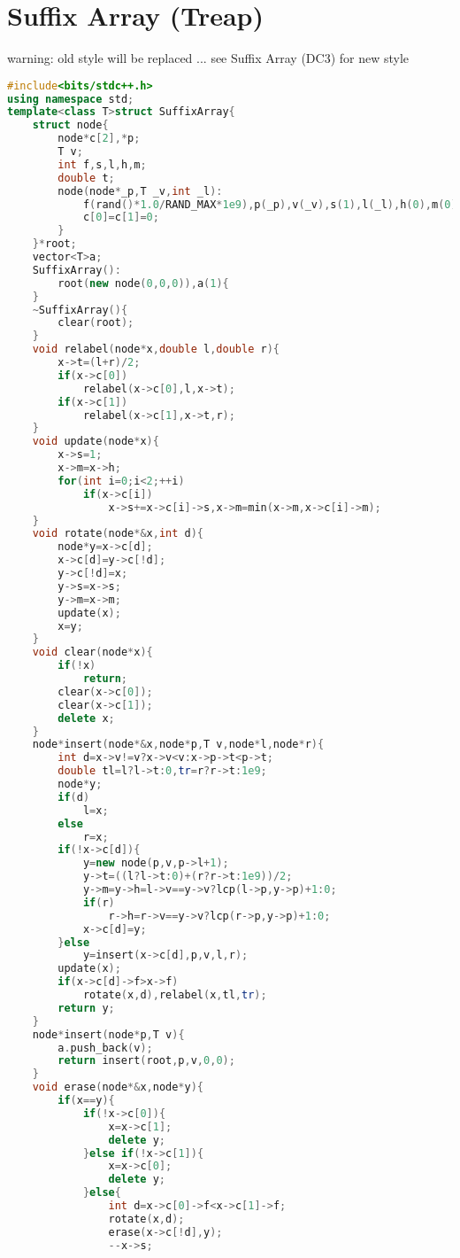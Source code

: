 \documentclass{book}
\begin{document}
\section{Suffix Array (Treap)}
warning: old style will be replaced ... see Suffix Array (DC3) for new style\begin{lstlisting}[language=C++,title={Suffix Array (Treap).hpp (3803 bytes, 147 lines)}]
#include<bits/stdc++.h>
using namespace std;
template<class T>struct SuffixArray{
    struct node{
        node*c[2],*p;
        T v;
        int f,s,l,h,m;
        double t;
        node(node*_p,T _v,int _l):
            f(rand()*1.0/RAND_MAX*1e9),p(_p),v(_v),s(1),l(_l),h(0),m(0),t(5e8){
            c[0]=c[1]=0;
        }
    }*root;
    vector<T>a;
    SuffixArray():
        root(new node(0,0,0)),a(1){
    }
    ~SuffixArray(){
        clear(root);
    }
    void relabel(node*x,double l,double r){
        x->t=(l+r)/2;
        if(x->c[0])
            relabel(x->c[0],l,x->t);
        if(x->c[1])
            relabel(x->c[1],x->t,r);
    }
    void update(node*x){
        x->s=1;
        x->m=x->h;
        for(int i=0;i<2;++i)
            if(x->c[i])
                x->s+=x->c[i]->s,x->m=min(x->m,x->c[i]->m);
    }
    void rotate(node*&x,int d){
        node*y=x->c[d];
        x->c[d]=y->c[!d];
        y->c[!d]=x;
        y->s=x->s;
        y->m=x->m;
        update(x);
        x=y;
    }
    void clear(node*x){
        if(!x)
            return;
        clear(x->c[0]);
        clear(x->c[1]);
        delete x;
    }
    node*insert(node*&x,node*p,T v,node*l,node*r){
        int d=x->v!=v?x->v<v:x->p->t<p->t;
        double tl=l?l->t:0,tr=r?r->t:1e9;
        node*y;
        if(d)
            l=x;
        else
            r=x;
        if(!x->c[d]){
            y=new node(p,v,p->l+1);
            y->t=((l?l->t:0)+(r?r->t:1e9))/2;
            y->m=y->h=l->v==y->v?lcp(l->p,y->p)+1:0;
            if(r)
                r->h=r->v==y->v?lcp(r->p,y->p)+1:0;
            x->c[d]=y;
        }else
            y=insert(x->c[d],p,v,l,r);
        update(x);
        if(x->c[d]->f>x->f)
            rotate(x,d),relabel(x,tl,tr);
        return y;
    }
    node*insert(node*p,T v){
        a.push_back(v);
        return insert(root,p,v,0,0);
    }
    void erase(node*&x,node*y){
        if(x==y){
            if(!x->c[0]){
                x=x->c[1];
                delete y;
            }else if(!x->c[1]){
                x=x->c[0];
                delete y;
            }else{
                int d=x->c[0]->f<x->c[1]->f;
                rotate(x,d);
                erase(x->c[!d],y);
                --x->s;

\end{lstlisting}
\end{document}
